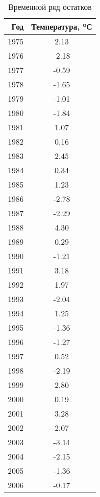 \begin{table}[H]
\centering
\begin{tabular}{|rc|}
  \hline
Год & Температура, ºС \\ 
  \hline
1975 & 2.13 \\ 
  1976 & -2.18 \\ 
  1977 & -0.59 \\ 
  1978 & -1.65 \\ 
  1979 & -1.01 \\ 
  1980 & -1.84 \\ 
  1981 & 1.07 \\ 
  1982 & 0.16 \\ 
  1983 & 2.45 \\ 
  1984 & 0.34 \\ 
  1985 & 1.23 \\ 
  1986 & -2.78 \\ 
  1987 & -2.29 \\ 
  1988 & 4.30 \\ 
  1989 & 0.29 \\ 
  1990 & -1.21 \\ 
  1991 & 3.18 \\ 
  1992 & 1.97 \\ 
  1993 & -2.04 \\ 
  1994 & 1.25 \\ 
  1995 & -1.36 \\ 
  1996 & -1.27 \\ 
  1997 & 0.52 \\ 
  1998 & -2.19 \\ 
  1999 & 2.80 \\ 
  2000 & 0.19 \\ 
  2001 & 3.28 \\ 
  2002 & 2.07 \\ 
  2003 & -3.14 \\ 
  2004 & -2.15 \\ 
  2005 & -1.36 \\ 
  2006 & -0.17 \\ 
   \hline
\end{tabular}
\caption{Временной ряд остатков} 
\label{table:residuals}
\end{table}
